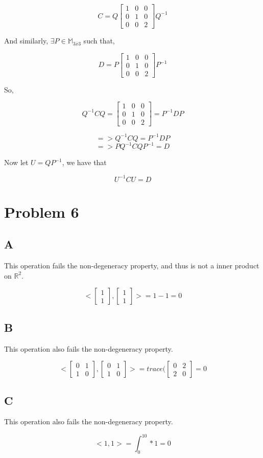 \documentclass{article}
\begin{document}
\[ C = Q\begin{bmatrix} 1 & 0 & 0 \\ 0 & 1 & 0 \\ 0 & 0 & 2 \end{bmatrix}Q^{-1} \]

And similarly, $\exists P \in \mathbb{M}_{3x3}$ such that,

\[ D = P\begin{bmatrix} 1 & 0 & 0 \\ 0 & 1 & 0 \\ 0 & 0 & 2 \end{bmatrix}P^{-1} \]

So,

\[ Q^{-1}CQ = \begin{bmatrix} 1 & 0 & 0 \\ 0 & 1 & 0 \\ 0 & 0 & 2 \end{bmatrix} = P^{-1}DP \]

\[ => Q^{-1}CQ = P^{-1}DP \]
\[ => PQ^{-1}CQP^{-1} = D \]

Now let $U = QP^{-1}$, we have that

\[ U^{-1}CU = D \]

\section*{Problem 6}
\subsection*{A}
This operation fails the non-degeneracy property, and thus is not a inner product on $\mathbb{R}^2$.

\[ <\begin{bmatrix} 1 \\ 1 \end{bmatrix}, \begin{bmatrix} 1 \\ 1 \end{bmatrix}> = 1 - 1 = 0 \]

\subsection*{B}
This operation also fails the non-degeneracy property.

\[ <\begin{bmatrix} 0 & 1 \\ 1 & 0 \end{bmatrix}, \begin{bmatrix} 0 & 1 \\ 1 & 0 \end{bmatrix}> = trace(\begin{bmatrix} 0 & 2 \\ 2 & 0 \end{bmatrix} = 0 \]

\subsection*{C}
This operation also fails the non-degeneracy property.

\[ <1, 1> = \int_0^10 * 1 = 0 \]
\end{document}
